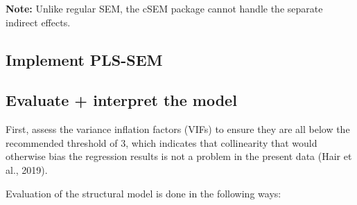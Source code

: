 \documentclass[
  letterpaper,
  DIV=11,
  numbers=noendperiod]{scrreprt}
\newenvironment{Shaded}{\begin{snugshade}}{\end{snugshade}}
\newcommand{\AttributeTok}[1]{\textcolor[rgb]{0.40,0.45,0.13}{#1}}
\newcommand{\CommentTok}[1]{\textcolor[rgb]{0.37,0.37,0.37}{#1}}
\newcommand{\DecValTok}[1]{\textcolor[rgb]{0.68,0.00,0.00}{#1}}
\newcommand{\FunctionTok}[1]{\textcolor[rgb]{0.28,0.35,0.67}{#1}}
\newcommand{\NormalTok}[1]{\textcolor[rgb]{0.00,0.23,0.31}{#1}}
\newcommand{\OtherTok}[1]{\textcolor[rgb]{0.00,0.23,0.31}{#1}}
\newcommand{\SpecialCharTok}[1]{\textcolor[rgb]{0.37,0.37,0.37}{#1}}
\newcommand{\StringTok}[1]{\textcolor[rgb]{0.13,0.47,0.30}{#1}}
\begin{document}
\textbf{Note:} Unlike regular SEM, the cSEM package cannot handle the
separate indirect effects.

\subsection{Implement PLS-SEM}\label{implement-pls-sem}

\begin{Shaded}
\end{Shaded}

\subsection{Evaluate + interpret the
model}\label{evaluate-interpret-the-model}

First, assess the variance inflation factors (VIFs) to ensure they are
all below the recommended threshold of 3, which indicates that
collinearity that would otherwise bias the regression results is not a
problem in the present data (Hair et al., 2019).

Evaluation of the structural model is done in the following ways:
\end{document}
